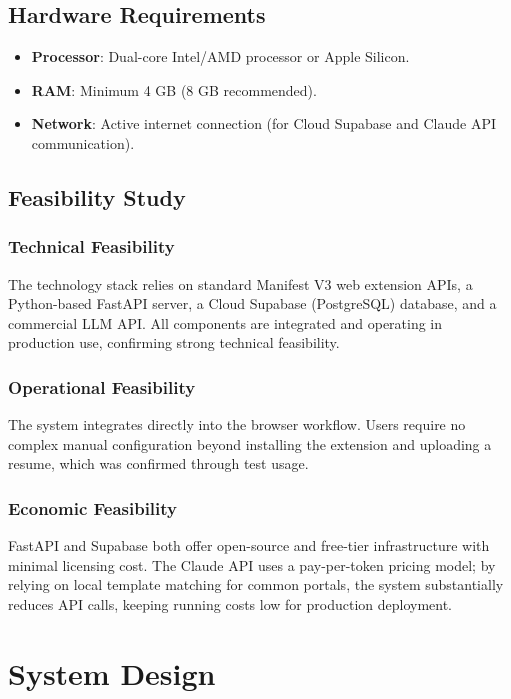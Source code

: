 \documentclass[12pt,a4paper]{report}
\begin{document}
\section{Hardware Requirements}
\begin{itemize}
    \item \textbf{Processor}: Dual-core Intel/AMD processor or Apple Silicon.
    \item \textbf{RAM}: Minimum 4 GB (8 GB recommended).
    \item \textbf{Network}: Active internet connection (for Cloud Supabase and Claude API communication).
\end{itemize}

\section{Feasibility Study}
\subsection{Technical Feasibility}
The technology stack relies on standard Manifest V3 web extension APIs, a Python-based FastAPI server, a Cloud Supabase (PostgreSQL) database, and a commercial LLM API. All components are integrated and operating in production use, confirming strong technical feasibility.
\subsection{Operational Feasibility}
The system integrates directly into the browser workflow. Users require no complex manual configuration beyond installing the extension and uploading a resume, which was confirmed through test usage.
\subsection{Economic Feasibility}
FastAPI and Supabase both offer open-source and free-tier infrastructure with minimal licensing cost. The Claude API uses a pay-per-token pricing model; by relying on local template matching for common portals, the system substantially reduces API calls, keeping running costs low for production deployment.

\chapter{System Design}
\end{document}

